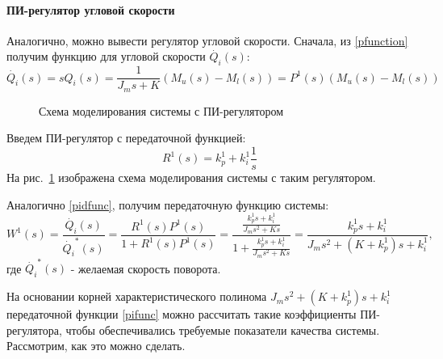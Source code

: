 \paragraph*{ПИ-регулятор угловой скорости\\}
\hspace*{\parindent}Аналогично, можно вывести регулятор угловой скорости. Сначала, из \eqref{pfunction} получим функцию для угловой скорости $\dot{Q_i}(s)$:
\begin{equation}
	\dot{Q_i}(s)=sQ_i(s)=\frac{1}{J_ms+K}(M_u(s)-M_l(s))=P^1(s)(M_u(s)-M_l(s))
\end{equation}

\begin{figure}[h]
	\noindent{}
	\caption{Схема моделирования системы с ПИ-регулятором}
	\label{pi}
\end{figure}

Введем ПИ-регулятор с передаточной функцией:
\begin{equation}
	R^1(s)=k_p^1+k_i^1\frac{1}{s}
\end{equation}
На рис.~\ref{pi} изображена схема моделирования системы с таким регулятором.

Аналогично \eqref{pidfunc}, получим передаточную функцию системы:
\begin{equation}\label{pifunc}
	W^1(s)=\frac{\dot{Q_i}(s)}{\dot{Q_i}^*(s)}=\frac{R^1(s)P^1(s)}{1+R^1(s)P^1(s)}=\frac{\frac{k_p^1s+k_i^1}{J_ms^2+Ks}}{1+\frac{k_p^1s+k_i^1}{J_ms^2+Ks}}=\frac{k_p^1s+k_i^1}{J_ms^2+(K+k_p^1)s+k_i^1},
\end{equation}
где $\dot{Q_i}^*(s)$ - желаемая скорость поворота.

На основании корней характеристического полинома $J_ms^2+(K+k_p^1)s+k_i^1$ передаточной функции \eqref{pifunc} можно рассчитать такие коэффициенты ПИ-регулятора, чтобы обеспечивались требуемые показатели качества системы. Рассмотрим, как это можно сделать. 
